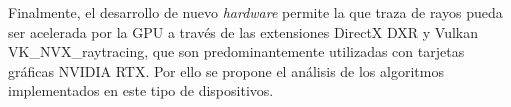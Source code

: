 Finalmente, el desarrollo de nuevo \textit{hardware} permite la que traza de rayos pueda ser acelerada por la GPU a través de las extensiones DirectX DXR y Vulkan VK\_NVX\_raytracing, que son predominantemente utilizadas con tarjetas gráficas NVIDIA RTX. Por ello se propone el análisis de los algoritmos implementados en este tipo de dispositivos.